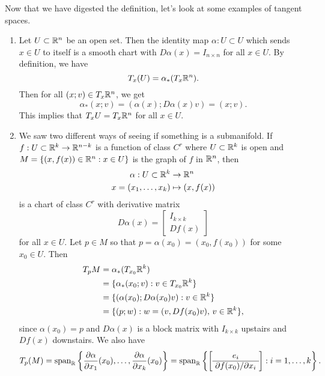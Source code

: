 Now that we have digested the definition, let's look at some examples of tangent spaces.
\begin{enumerate}[(1)]
    \item Let $U \subset \mathbb{R}^n$ be an open set. Then the identity map 
    $\alpha : U \subset U$ which sends $x \in U$ to itself is a smooth 
    chart with $D\alpha(x) = I_{n\times n}$ for all $x \in U$. By 
    definition, we have  
    \[ T_x(U) = \alpha_*(T_x\mathbb{R}^n). \] 
    Then for all $(x; v) \in T_x\mathbb{R}^n$, we get 
    \[ \alpha_*(x; v) = (\alpha(x); D\alpha(x)v) = (x; v). \] 
    This implies that $T_xU = T_x\mathbb{R}^n$ for all $x \in U$. 

    \item We saw two different ways of seeing if something is a submanifold. If $f : U \subset \mathbb{R}^k 
    \to \mathbb{R}^{n-k}$ is a function of class $C^r$ where $U \subset \mathbb{R}^k$ is open and 
    $M = \{(x, f(x)) \in \mathbb{R}^n : x \in U\}$ is the graph of $f$ in $\mathbb{R}^n$, then 
    \begin{align*}
        \alpha : U \subset \mathbb{R}^k &\to \mathbb{R}^n \\ 
        x = (x_1, \dots, x_k) &\mapsto (x, f(x))
    \end{align*}
    is a chart of class $C^r$ with derivative matrix 
    \[ D\alpha(x) = \left[ \begin{array}{c} 
        I_{k\times k} \\\hline \!Df(x)\!
    \end{array} \right] \] 
    for all $x \in U$. Let $p \in M$ so that $p = \alpha(x_0) = (x_0, f(x_0))$ for some $x_0 \in U$. Then 
    \begin{align*} 
        T_pM &= \alpha_*(T_{x_0}\mathbb{R}^k) \\
        &= \{\alpha_*(x_0; v) : v \in T_{x_0}\mathbb{R}^k\} \\
        &= \{(\alpha(x_0); D\alpha(x_0)v) : v \in \mathbb{R}^k\} \\ 
        &= \{(p; w) : w = (v, Df(x_0)v),\, v \in \mathbb{R}^k\}, 
    \end{align*} 
    since $\alpha(x_0) = p$ and $D\alpha(x)$ is a block matrix with $I_{k\times k}$ 
    upstairs and $Df(x)$ downstairs. We also have 
    \[ T_p(M) = {\rm span}_{\mathbb{R}} \left\{ \frac{\partial\alpha}{\partial x_1}(x_0), \dots, 
    \frac{\partial\alpha}{\partial x_k}(x_0) \right\} = {\rm span}_{\mathbb{R}} 
    \left\{ \left[ \begin{array}{c} 
        e_i \\\hline \!\partial f(x_0)/\partial x_i\!
    \end{array} \right] : 
    i = 1, \dots, k \right\}. \] 


\end{enumerate}
